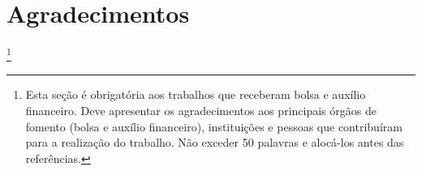 \documentclass{modelo}
\newcommand{\agradecimentosTexto}{Esta seção é obrigatória aos trabalhos que receberam bolsa e auxílio financeiro. Deve apresentar os agradecimentos aos principais órgãos de fomento (bolsa e auxílio financeiro), instituições e pessoas que contribuíram para a realização do trabalho. Não exceder 50 palavras e alocá-los antes das referências.}
\begin{document}
 




\newpage  


 
 
 
\section*{Agradecimentos}
\thanks{\agradecimentosTexto}    

\end{document}
